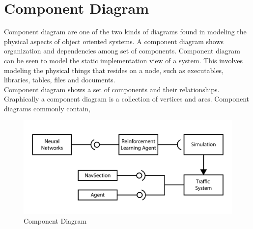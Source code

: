 \documentclass[openany,12pt]{report}
\begin{document}
		\section{Component Diagram}
		\hspace*{0.5in}Component diagram are one of the two kinds of diagrams found in modeling the physical aspects of object oriented systems. A component diagram shows organization and dependencies among set of components. Component diagram can be seen to model the static implementation view of a system. This involves modeling the physical things that resides on a node, such as executables, libraries, tables, files and documents.\\
		\hspace*{0.5in}Component diagram shows a set of components and their relationships. Graphically a component diagram is a collection of vertices and arcs. Component diagrams commonly contain,
		\begin{figure}[H]
			\centering
			\includegraphics[width=5.6in]{./Diagrams/PNG/cc}
			\caption{Component Diagram}
		\end{figure}
		\newpage

	
\end{document}

